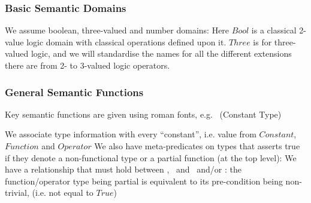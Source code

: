 \subsubsection{Basic Semantic Domains}

We assume boolean, three-valued and number domains:
Here $Bool$ is a classical 2-value logic domain
with classical operations defined upon it.
$Three$ is for three-valued logic,
and we will standardise the names for all
the different extensions there are from 2- to 3-valued
logic operators.

\subsubsection{General Semantic Functions}

Key semantic functions are given using roman fonts,
e.g. \ctype\ (Constant Type)

We associate type information with every ``constant'',
i.e.  value from $Constant$, $Function$ and $Operator$
We also have meta-predicates on types that
asserts true if they denote a non-functional type
or a partial function (at the top level):
We have a relationship that must hold between \ctype, \ispartial\
and \fpre\ and/or \opre: the function/operator type
being partial is equivalent to its pre-condition being non-trivial,
(i.e. not equal to $True$)



